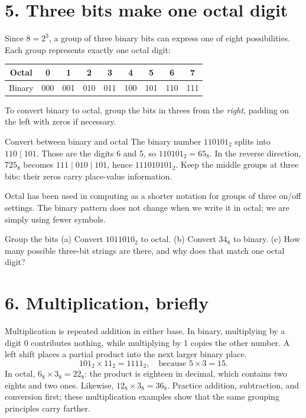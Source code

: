 \documentclass[10pt]{article}
\newcommand{\sect}[1]{\medskip\section*{\color{olive}#1}\vspace{-5pt}}
\begin{document}
\sect{5. Three bits make one octal digit}
Since $8=2^3$, a group of three binary bits can express one of eight possibilities. Each group represents exactly one octal digit:
\begin{center}\small\begin{tabular}{c|cccccccc}\toprule
Octal &0&1&2&3&4&5&6&7\\\midrule
Binary &000&001&010&011&100&101&110&111\\\bottomrule
\end{tabular}\end{center}
To convert binary to octal, group the bits in threes from the \emph{right}, padding on the left with zeros if necessary.
\begin{worked}{Convert between binary and octal}
The binary number $110101_2$ splits into $110\mid101$. Those are the digits 6 and 5, so $110101_2=65_8$. In the reverse direction, $725_8$ becomes $111\mid010\mid101$, hence $111010101_2$. Keep the middle groups at three bits: their zeros carry place-value information.
\end{worked}
Octal has been used in computing as a shorter notation for groups of three on/off settings. The binary pattern does not change when we write it in octal; we are simply using fewer symbols.
\begin{taskbox}{Group the bits}
(a) Convert $1011010_2$ to octal. (b) Convert $34_8$ to binary. (c) How many possible three-bit strings are there, and why does that match one octal digit?
\end{taskbox}

\sect{6. Multiplication, briefly}
Multiplication is repeated addition in either base. In binary, multiplying by a digit 0 contributes nothing, while multiplying by 1 copies the other number. A left shift places a partial product into the next larger binary place.
\[
101_2 \times 11_2=1111_2,
\quad\text{because }5\times3=15.
\]
In octal, $6_8\times3_8=22_8$: the product is eighteen in decimal, which contains two eights and two ones. Likewise, $12_8\times3_8=36_8$. Practice addition, subtraction, and conversion first; these multiplication examples show that the same grouping principles carry farther.
\end{document}
